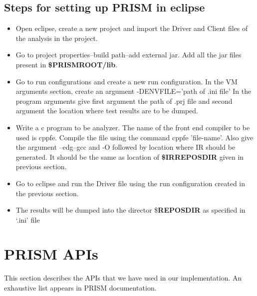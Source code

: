\documentclass[11pt,a4paper,openright]{report}
\begin{document}
\section{Steps for setting up PRISM in eclipse}
\begin{itemize}
 \item Open eclipse, create a new project and import the Driver and Client files of the analysis in the project.
 \item Go to project properties–build path–add external jar. Add all the jar files present in \textbf{\$PRISMROOT/lib}.
 \item Go to run configurations and create a new run configuration. In the VM arguments section, create an argument -DENVFILE=’path of .ini
file’ In the program arguments give first argument the path of .prj file and second argument the location where test results are to be dumped.
\item Write a c program to be analyzer. The name of the front end compiler to be used is cppfe. Compile the file using the command cppfe ’file-name’.
Also give the argument –edg–gcc and -O followed by location where IR should be generated. It should be the same as location of \textbf{\$IRREPOSDIR} given in
previous section.
\item Go to eclipse and run the Driver file using the run configuration created in the previous section.
\item The results will be dumped into the director \$\textbf{REPOSDIR} as specified in `.ini' file
\end{itemize}

 
 
 
 
 
\chapter{PRISM APIs}\label{ap:B}

This section describes the APIs that we have used in our implementation. An exhaustive list appears in PRISM documentation.
\end{document}
